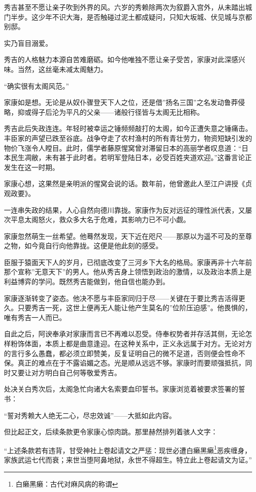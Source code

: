 \documentclass[
]{book}
\begin{document}
秀吉甚至不愿让亲子吹到外界的风。六岁的秀赖除两次为叙爵入宫外，从未踏出城门半步。这少年不识大海，是否触碰过泥土都成疑问，只知大坂城、伏见城与京都别邸。

实乃盲目溺爱。

秀吉的人格魅力本源自苦难磨砺。如今他唯独不愿让亲子受苦，家康对此深感兴味。当然，这丝毫未减太阁魅力。

``确实很有太阁风范。''

家康如是想。无论是从奴仆骤登天下人之位，还是借''扬名三国''之名发动鲁莽侵略，抑或得子后沦为平凡的父亲------诸般行径皆与太阁无比相称。

秀吉此后失政连连。年轻时被幸运之锤频频敲打的太阁，如今正遭失意之锤痛击。丰臣家的声望已跌至谷底。战争夺走了农村渔村的所有青壮劳力，物资短缺引发的物价飞涨令人瞠目。此时，儒学者藤原惺窝曾对滞留日本的高丽学者叹息道：``日本民生凋敝，未有甚于此时者。若明军登陆日本，必受百姓夹道欢迎。''这番言论正发生在这一时期。

家康心想，这果然是亲明派的惺窝会说的话。数年前，他曾邀此人至江户讲授《贞观政要》。

一连串失政的结果，人心自然向德川靠拢。家康作为反对远征的理性派代表，又屡次平息太阁怒火，救众多大名于危难，其影响力已不可小觑。

家康忽然萌生一丝希望。他蓦然发现，天下近在咫尺------那原以为遥不可及的至尊之物，如今竟自行向他靠拢。这便是他此刻的感受。

臣服于猿面天下人的岁月，已彻底改变了三河乡下大名的格局。家康再非十六年前那个宣称''无意天下''的男人。他从秀吉身上领悟到政治的激情，以及政治本质上是利益博弈的学问。既然秀吉能做到，他自信也能办到。

家康逐渐转变了姿态。他决不愿与丰臣家同归于尽------关键在于要比秀吉活得更久。只要秀吉一死，这世上便再无人能让他产生莫名的''位阶压迫感''。他畏惧的，唯有秀吉一人而已。

自此之后，阿谀奉承对家康而言已不再难以忍受。侍奉权势者并存活其侧，无论怎样粉饰体面，本质上都是曲意逢迎。在这种关系中，正义永远属于对方。无论对方的言行多么愚蠢，都必须立即赞美，反复证明自己的微不足道，否则便会性命不保。真正的难点在于不露谄媚之态。光是顺从远远不够。家康时而要顽强抵抗，同时又要让对方明白自己何等敬爱秀吉。

处决关白秀次后，太阁急忙向诸大名索要血印誓书。家康浏览着被要求签署的誓书：

``誓对秀赖大人绝无二心，尽忠效诚''------大抵如此内容。

但比起正文，后续条款更令家康心惊肉跳。那里赫然排列着骇人文字：

``上述条款若有违背，甘受神社上卷起请文之严惩：现世必遭白癞黑癞\footnote{白癞黑癞：古代对麻风病的称谓}恶疾缠身，家族武运七代而衰；来世当堕阿鼻地狱，永世不得超生。特立此上卷起请文为证。''
\end{document}
